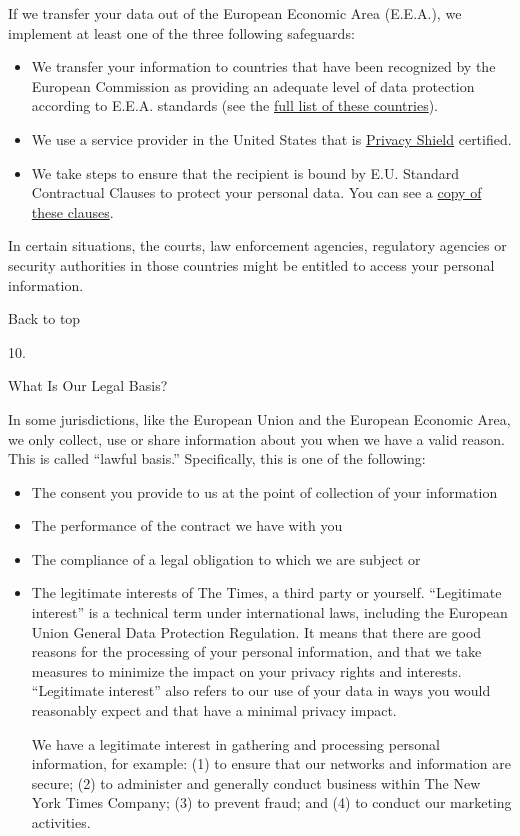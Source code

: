 If we transfer your data out of the European Economic Area (E.E.A.), we
implement at least one of the three following safeguards:

\begin{itemize}
\tightlist
\item
  We transfer your information to countries that have been recognized by
  the European Commission as providing an adequate level of data
  protection according to E.E.A. standards (see the
  \href{https://ec.europa.eu/info/law/law-topic/data-protection/international-dimension-data-protection/adequacy-decisions_en}{full
  list of these countries}).
\item
  We use a service provider in the United States that is
  \href{https://www.privacyshield.gov/welcome}{Privacy Shield}
  certified.
\item
  We take steps to ensure that the recipient is bound by E.U. Standard
  Contractual Clauses to protect your personal data. You can see a
  \href{https://ec.europa.eu/info/law/law-topic/data-protection/international-dimension-data-protection/standard-contractual-clauses-scc_en}{copy
  of these clauses}.
\end{itemize}

In certain situations, the courts, law enforcement agencies, regulatory
agencies or security authorities in those countries might be entitled to
access your personal information.

Back to top

10.

What Is Our Legal Basis?

In some jurisdictions, like the European Union and the European Economic
Area, we only collect, use or share information about you when we have a
valid reason. This is called ``lawful basis.'' Specifically, this is one
of the following:

\begin{itemize}
\item
  The consent you provide to us at the point of collection of your
  information
\item
  The performance of the contract we have with you
\item
  The compliance of a legal obligation to which we are subject or
\item
  The legitimate interests of The Times, a third party or yourself.
  ``Legitimate interest'' is a technical term under international laws,
  including the European Union General Data Protection Regulation. It
  means that there are good reasons for the processing of your personal
  information, and that we take measures to minimize the impact on your
  privacy rights and interests. ``Legitimate interest'' also refers to
  our use of your data in ways you would reasonably expect and that have
  a minimal privacy impact.

  We have a legitimate interest in gathering and processing personal
  information, for example: (1) to ensure that our networks and
  information are secure; (2) to administer and generally conduct
  business within The New York Times Company; (3) to prevent fraud; and
  (4) to conduct our marketing activities.
\end{itemize}

